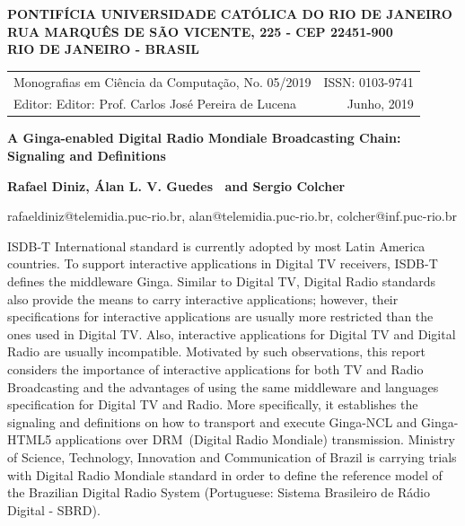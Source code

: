 \documentclass[11pt]{article}
\makeatletter
\newcommand{\ISSNno}{0103-9741}
\newcommand{\MCCSeqAno}{05/2019}
\newcommand{\TituloCapa}{A Ginga-enabled Digital Radio Mondiale Broadcasting Chain:
  Signaling and Definitions}
\newcommand{\AutorANome}{Rafael Diniz}
\newcommand{\AutorAemail}{rafaeldiniz@telemidia.puc-rio.br}
\newcommand{\AutorBNome}{Álan L. V. Guedes}
\newcommand{\AutorBemail}{alan@telemidia.puc-rio.br}
\newcommand{\AutorCNome}{Sergio Colcher}
\newcommand{\AutorCemail}{colcher@inf.puc-rio.br}
\newenvironment{capalayout}{
    \setlength{\topmargin}{-3.0cm}
    \setlength{\footskip}{0cm}
    \thispagestyle{empty}
}
\makeatother
\begin{document}
\begin{capalayout}
        \begin{minipage}[h]{14.5cm}
            \doublespacing
            \begin{center} 
                \fontsize{12}{14}\selectfont
                \textbf{PONTIFÍCIA UNIVERSIDADE CATÓLICA DO RIO DE JANEIRO} \\
                \textbf{RUA MARQUÊS DE SÃO VICENTE, 225 - CEP 22451-900} \\
                \textbf{RIO DE JANEIRO - BRASIL}
            \end{center}
        \end{minipage}
        \newpage
    \end{capalayout}


\thispagestyle{empty}

\begin{flushleft}
\begin{tabular}{p{11.1cm}r}
Monografias em Ciência da Computação, No. \MCCSeqAno & ISSN: \ISSNno \\
Editor: Editor: Prof. Carlos José Pereira de Lucena   & Junho, 2019
\end{tabular}
\end{flushleft}
\LARGE
\bigskip
\begin{center}
    {\bf \TituloCapa}
\end{center}
\normalsize
\bigskip
\begin{center}
{\bf \AutorANome, \AutorBNome~ and \AutorCNome}
\end{center}
\begin{center}
   \AutorAemail, \AutorBemail, \AutorCemail
\end{center}

 ISDB-T International standard is currently adopted by most Latin America
    countries. To support interactive applications in Digital TV receivers, ISDB-T
    defines the middleware Ginga. Similar to Digital TV, Digital Radio standards
    also provide the means to carry interactive applications; however, their
    specifications for interactive applications are usually more restricted than
    the ones used in Digital TV.
    Also, interactive applications for Digital TV and Digital Radio are usually
    incompatible.
    Motivated by such observations, this report considers the importance of
    interactive applications for both TV and Radio Broadcasting and the advantages
    of using the same middleware and languages specification for Digital TV and
    Radio.
    More specifically, it establishes the signaling and definitions on how to
    transport and execute Ginga-NCL and Ginga-HTML5 applications
    over DRM~(Digital Radio Mondiale) transmission.
    Ministry of Science, Technology, Innovation and Communication of Brazil is
    carrying trials with Digital Radio Mondiale standard in order to define the
    reference model of the Brazilian Digital Radio System (Portuguese: Sistema
    Brasileiro de Rádio Digital - SBRD).
\medskip
\end{document}
